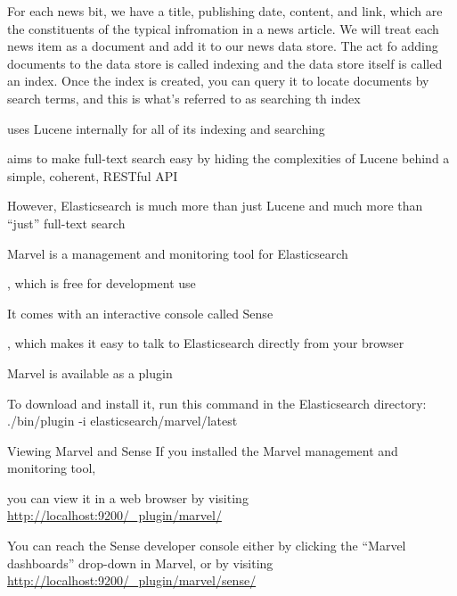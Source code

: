 
For each news bit, we have a title, publishing date, content, and link, which are the constituents of the typical infromation in a news article. We will treat each news item as a document and add it to our news data store. The act fo adding documents to the data store is called indexing and the data store itself is called an index. Once the index is created, you can query it to locate documents by search terms, and this is what's referred to as searching th index

uses Lucene internally for all of its indexing and searching

aims to make full-text search easy by hiding the complexities of Lucene behind a simple, coherent, RESTful API

However, Elasticsearch is much more than just Lucene and much more than “just” full-text search

Marvel is a management and monitoring tool for Elasticsearch

, which is free for development use

It comes with an interactive console called Sense

, which makes it easy to talk to Elasticsearch directly from your browser

Marvel is available as a plugin

To download and install it, run this command in the Elasticsearch directory: ./bin/plugin -i elasticsearch/marvel/latest 

Viewing Marvel and Sense If you installed the Marvel management and monitoring tool, 

you can view it in a web browser by visiting \url{http://localhost:9200/_plugin/marvel/}

You can reach the Sense developer console either by clicking the “Marvel dashboards” drop-down in Marvel, or by visiting \url{http://localhost:9200/_plugin/marvel/sense/}
